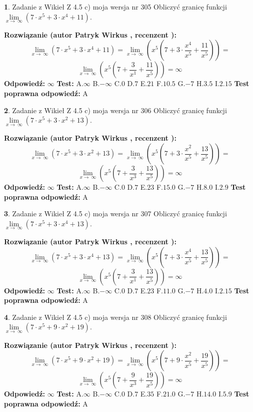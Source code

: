\documentclass[12pt, a4paper]{article}
\theoremstyle{definition} %
\newtheorem{zad}{}
\newcommand{\zadStart}[1]{\begin{zad}#1\newline}
\newcommand{\zadStop}{\end{zad}}
\newcommand{\rozwStart}[2]{\noindent \textbf{Rozwiązanie (autor #1 , recenzent #2): }\newline}
\newcommand{\rozwStop}{\newline}
\newcommand{\odpStart}{\noindent \textbf{Odpowiedź:}\newline}
\newcommand{\odpStop}{\newline}
\newcommand{\testStart}{\noindent \textbf{Test:}\newline}
\newcommand{\testStop}{\newline}
\newcommand{\kluczStart}{\noindent \textbf{Test poprawna odpowiedź:}\newline}
\newcommand{\kluczStop}{\newline}
\begin{document}
\zadStart{Zadanie z Wikieł Z 4.5 c) moja wersja nr 305}
Obliczyć granicę funkcji  $\lim\limits_{x\to\ \infty}(7 \cdot x^{5}+3 \cdot x^{4}+11)$.
\zadStop
\rozwStart{Patryk Wirkus}{}
$$\lim\limits_{x\to\ \infty}(7 \cdot x^{5}+3 \cdot x^{4}+11) = \lim\limits_{x\to\ \infty}(x^{5}(7 +3 \cdot \frac{x^{4}}{x^{5}}+\frac{11}{x^{5}})) =$$ $$\lim\limits_{x\to\ \infty}(x^{5}(7 +\frac{3}{x^{1}}+\frac{11}{x^{5}})) =\infty$$
\rozwStop
\odpStart
$\infty$
\odpStop
\testStart
A.$\infty$ B.$-\infty$ C.$0$ D.$7$ E.$21$
F.$10.5$ G.$-7$
H.$3.5$
I.$2.15$
\testStop
\kluczStart
A
\kluczStop



\zadStart{Zadanie z Wikieł Z 4.5 c) moja wersja nr 306}
Obliczyć granicę funkcji  $\lim\limits_{x\to\ \infty}(7 \cdot x^{5}+3 \cdot x^{2}+13)$.
\zadStop
\rozwStart{Patryk Wirkus}{}
$$\lim\limits_{x\to\ \infty}(7 \cdot x^{5}+3 \cdot x^{2}+13) = \lim\limits_{x\to\ \infty}(x^{5}(7 +3 \cdot \frac{x^{2}}{x^{5}}+\frac{13}{x^{5}})) =$$ $$\lim\limits_{x\to\ \infty}(x^{5}(7 +\frac{3}{x^{3}}+\frac{13}{x^{5}})) =\infty$$
\rozwStop
\odpStart
$\infty$
\odpStop
\testStart
A.$\infty$ B.$-\infty$ C.$0$ D.$7$ E.$23$
F.$15.0$ G.$-7$
H.$8.0$
I.$2.9$
\testStop
\kluczStart
A
\kluczStop



\zadStart{Zadanie z Wikieł Z 4.5 c) moja wersja nr 307}
Obliczyć granicę funkcji  $\lim\limits_{x\to\ \infty}(7 \cdot x^{5}+3 \cdot x^{4}+13)$.
\zadStop
\rozwStart{Patryk Wirkus}{}
$$\lim\limits_{x\to\ \infty}(7 \cdot x^{5}+3 \cdot x^{4}+13) = \lim\limits_{x\to\ \infty}(x^{5}(7 +3 \cdot \frac{x^{4}}{x^{5}}+\frac{13}{x^{5}})) =$$ $$\lim\limits_{x\to\ \infty}(x^{5}(7 +\frac{3}{x^{1}}+\frac{13}{x^{5}})) =\infty$$
\rozwStop
\odpStart
$\infty$
\odpStop
\testStart
A.$\infty$ B.$-\infty$ C.$0$ D.$7$ E.$23$
F.$11.0$ G.$-7$
H.$4.0$
I.$2.15$
\testStop
\kluczStart
A
\kluczStop



\zadStart{Zadanie z Wikieł Z 4.5 c) moja wersja nr 308}
Obliczyć granicę funkcji  $\lim\limits_{x\to\ \infty}(7 \cdot x^{5}+9 \cdot x^{2}+19)$.
\zadStop
\rozwStart{Patryk Wirkus}{}
$$\lim\limits_{x\to\ \infty}(7 \cdot x^{5}+9 \cdot x^{2}+19) = \lim\limits_{x\to\ \infty}(x^{5}(7 +9 \cdot \frac{x^{2}}{x^{5}}+\frac{19}{x^{5}})) =$$ $$\lim\limits_{x\to\ \infty}(x^{5}(7 +\frac{9}{x^{3}}+\frac{19}{x^{5}})) =\infty$$
\rozwStop
\odpStart
$\infty$
\odpStop
\testStart
A.$\infty$ B.$-\infty$ C.$0$ D.$7$ E.$35$
F.$21.0$ G.$-7$
H.$14.0$
I.$5.9$
\testStop
\kluczStart
A
\kluczStop
\end{document}
